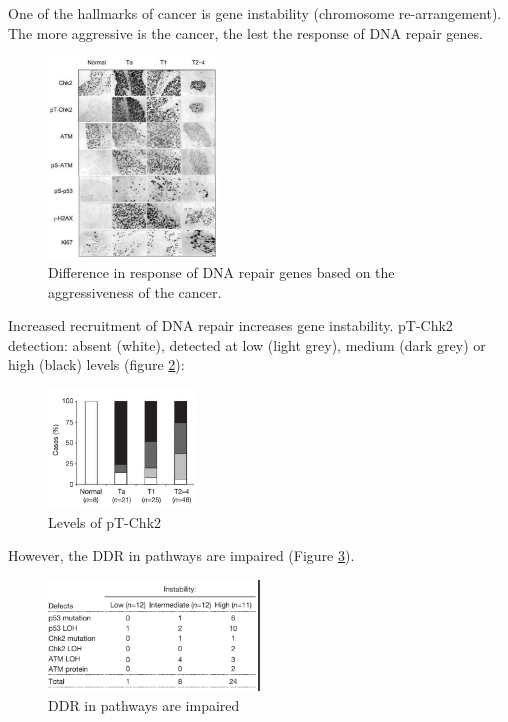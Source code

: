 One of the hallmarks of cancer is gene instability (chromosome re-arrangement). The more aggressive is the cancer, the lest the response of DNA repair genes. 

\begin{figure}
\centering
\includegraphics[width=0.4\textwidth]{../_resources/b6767c28ca4d9960f33b0d725382b694.png}
\caption{Difference in response of DNA repair genes based on the aggressiveness of the cancer.}
\label{fig:repair}
\end{figure}

Increased recruitment of DNA repair increases gene instability. pT-Chk2 detection: absent (white), detected at low (light grey), medium (dark grey) or high (black) levels (figure \ref{fig:pT-Chk2}):

\begin{figure}
\centering
\includegraphics[width=0.35\textwidth]{../_resources/168deb888ea330cd5cfa4cd813e7260d.png}
\caption{Levels of pT-Chk2}
\label{fig:pT-Chk2}
\end{figure}

However, the DDR in pathways are impaired (Figure \ref{fig:DDR}).

\begin{figure}
\centering
\includegraphics[width=0.5\textwidth]{../_resources/eca41a16e9bce1f13534cbefd1902bbe.png}
\caption{DDR in pathways are impaired}
\label{fig:DDR}
\end{figure}

